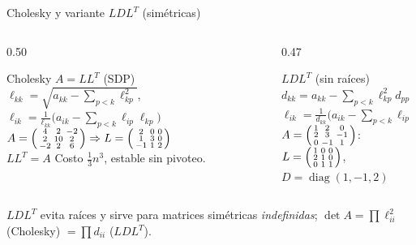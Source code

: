 \documentclass[aspectratio=169,10pt]{beamer}
\begin{document}
\begin{frame}{Cholesky y variante $LDL^{T}$ (simétricas)}
\begin{columns}[T]
\begin{column}{0.50\textwidth}
\begin{cardidea}{Cholesky $A=LL^{T}$ (SDP)}{\faSuperscript}
{\footnotesize $\ell_{kk}=\sqrt{a_{kk}-\!\sum_{p<k}\ell_{kp}^2}$,\; $\ell_{ik}=\tfrac{1}{\ell_{kk}}\big(a_{ik}-\!\sum_{p<k}\ell_{ip}\ell_{kp}\big)$\\[1.6mm]
$A=\begin{psmallmatrix}4&2&-2\\2&10&2\\-2&2&6\end{psmallmatrix}\Rightarrow L=\begin{psmallmatrix}2&0&0\\1&3&0\\-1&1&2\end{psmallmatrix}$\\[1.2mm]
$LL^{T}=A$ \checkmark\; Costo $\tfrac13 n^3$, estable sin pivoteo.}
\end{cardidea}
\end{column}
\begin{column}{0.47\textwidth}
\begin{cardgear}{$LDL^{T}$ (sin raíces)}{\faSuperscript}
{\footnotesize $d_{kk}=a_{kk}-\!\sum_{p<k}\ell_{kp}^2 d_{pp}$\\[0.8mm]
$\ell_{ik}=\tfrac{1}{d_{kk}}\big(a_{ik}-\!\sum_{p<k}\ell_{ip}\ell_{kp}d_{pp}\big)$\\[1.6mm]
$A=\begin{psmallmatrix}1&2&0\\2&3&-1\\0&-1&1\end{psmallmatrix}$:\\[1.2mm]
$L=\begin{psmallmatrix}1&0&0\\2&1&0\\0&1&1\end{psmallmatrix}$, $D=\operatorname{diag}(1,-1,2)$}
\end{cardgear}
\end{column}
\end{columns}
\vspace{1mm}
\begin{cardnota}[\faInfoCircle]
{\footnotesize $LDL^{T}$ evita raíces y sirve para matrices simétricas \emph{indefinidas}; $\det A=\prod \ell_{ii}^2$ (Cholesky) $=\prod d_{ii}$ ($LDL^{T}$).}
\end{cardnota}
\end{frame}
\end{document}
